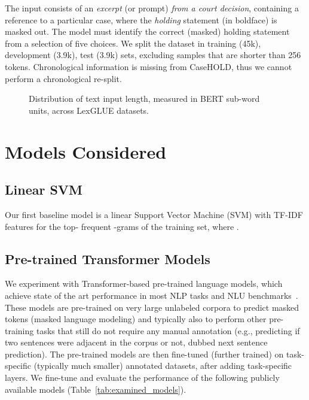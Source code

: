 \documentclass[11pt]{article}
\begin{document}
The input consists of an \emph{excerpt} (or prompt) \emph{from a court decision}, containing a reference to a particular case, where the \emph{holding} statement (in boldface) is masked out.
The model must identify the correct (masked) holding statement from a selection of five choices.
We split the dataset in training (45k), development (3.9k), test (3.9k) sets, excluding samples that are shorter than 256 tokens. Chronological information is missing from CaseHOLD, thus we cannot perform a chronological re-split.

\begin{figure*}
    \centering
    \vspace{-6mm}
    \caption{Distribution of text input length, measured in BERT sub-word units, across LexGLUE datasets.}
    \label{fig:lengths}
    \vspace{-5mm}
\end{figure*}


\section{Models Considered}

\subsection{Linear SVM}
Our first baseline model is a linear Support Vector Machine (SVM) \cite{cortes-1995} with TF-IDF features for the top- frequent -grams of the training set, where .

\subsection{Pre-trained Transformer Models} \label{sec:pretrainedModels}
\label{sec:baselines}
We experiment with Transformer-based \cite{Vaswani2017} pre-trained language models, which achieve state of the art performance in most NLP tasks \cite{bommasani2021opportunities} and NLU benchmarks~\cite{wang-2019-superglue}. These models are pre-trained on very large unlabeled corpora to predict masked tokens (masked language modeling) and typically also to perform other pre-training tasks that still do not require any manual annotation (e.g., predicting if two sentences were adjacent in the corpus or not, dubbed next sentence prediction). The pre-trained models are then fine-tuned (further trained) on task-specific (typically much smaller) annotated datasets, after adding task-specific layers. 
We fine-tune and evaluate the performance of the following publicly available models (Table~\ref{tab:examined_models}).\vspace{2mm}
\end{document}
